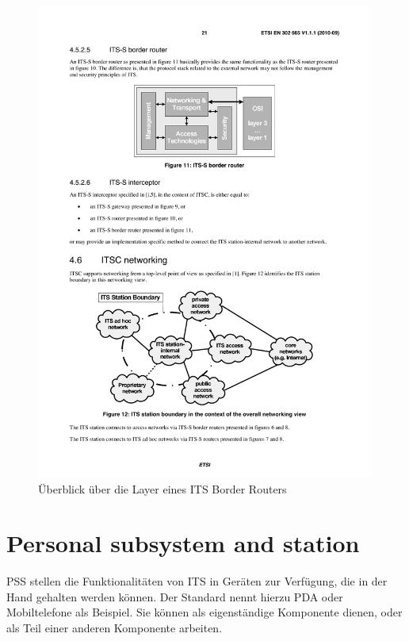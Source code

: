   
\begin{figure}
	\includegraphics[width=0.99\textwidth]{content/images/01_funktionsweise/layer_borderRouter.pdf}
	\caption{Überblick über die Layer eines ITS Border Routers \cite{en302665}}
	\label{fig:funktionsweise_borderRouter}
\end{figure}



\section{Personal subsystem and station}
\ac{PSS} stellen die Funktionalitäten von \ac{ITS} in Geräten zur Verfügung, die in der Hand gehalten werden können. Der Standard nennt hierzu \ac{PDA} oder Mobiltelefone als Beispiel. Sie können als eigenständige Komponente dienen, oder als Teil einer anderen Komponente arbeiten.

